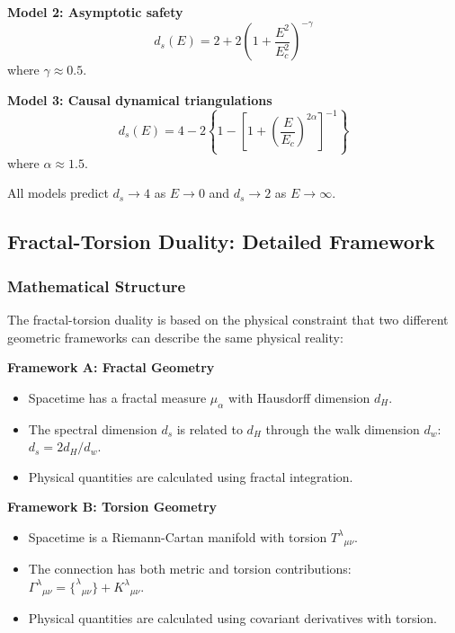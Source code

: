 \documentclass[UTF8]{ctex}\n\documentclass[12pt,a4paper]{article}
\begin{document}
\textbf{Model 2: Asymptotic safety}
\begin{equation}
    d_s(E) = 2 + 2\left(1 + \frac{E^2}{E_c^2}\right)^{-\gamma}
\end{equation}
where $\gamma \approx 0.5$.

\textbf{Model 3: Causal dynamical triangulations}
\begin{equation}
    d_s(E) = 4 - 2\left\{1 - \left[1 + \left(\frac{E}{E_c}\right)^{2\alpha}\right]^{-1}\right\}
\end{equation}
where $\alpha \approx 1.5$.

All models predict $d_s \to 4$ as $E \to 0$ and $d_s \to 2$ as $E \to \infty$.

\subsection{Fractal-Torsion Duality: Detailed Framework}

\subsubsection{Mathematical Structure}

The fractal-torsion duality is based on the physical constraint that two different geometric frameworks can describe the same physical reality:

\textbf{Framework A: Fractal Geometry}
\begin{itemize}
    \item Spacetime has a fractal measure $\mu_\alpha$ with Hausdorff dimension $d_H$.
    \item The spectral dimension $d_s$ is related to $d_H$ through the walk dimension $d_w$: $d_s = 2d_H/d_w$.
    \item Physical quantities are calculated using fractal integration.
\end{itemize}

\textbf{Framework B: Torsion Geometry}
\begin{itemize}
    \item Spacetime is a Riemann-Cartan manifold with torsion $T^\lambda{}_{\mu\nu}$.
    \item The connection has both metric and torsion contributions: $\Gamma^\lambda{}_{\mu\nu} = \{^\lambda{}_{\mu\nu}\} + K^\lambda{}_{\mu\nu}$.
    \item Physical quantities are calculated using covariant derivatives with torsion.
\end{itemize}
\end{document}
